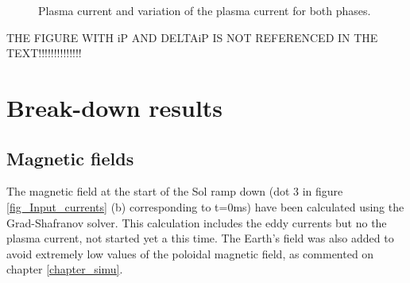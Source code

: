 \documentclass[a4paper,12pt,oneside]{book}
\begin{document}
\begin{figure}[t]
\centering
{}
\hfill
{}

\hfill
{}

\caption{Plasma current and variation of the plasma current for both phases.}
\label{fig_Ip}
\end{figure}

THE FIGURE WITH iP AND DELTAiP IS NOT REFERENCED IN THE TEXT!!!!!!!!!!!!!!

\section{Break-down results}

\subsection{Magnetic fields}
\label{sec_results_fields}

The magnetic field at the start of the Sol ramp down (dot 3 in figure \ref{fig_Input_currents} (b) corresponding to t=0ms) have been calculated using the Grad-Shafranov solver. This calculation includes the eddy currents but no the plasma current, not started yet a this time.
%
The Earth's field was also added to avoid extremely low values of the poloidal magnetic field, as commented on chapter \ref{chapter_simu}.
\end{document}
